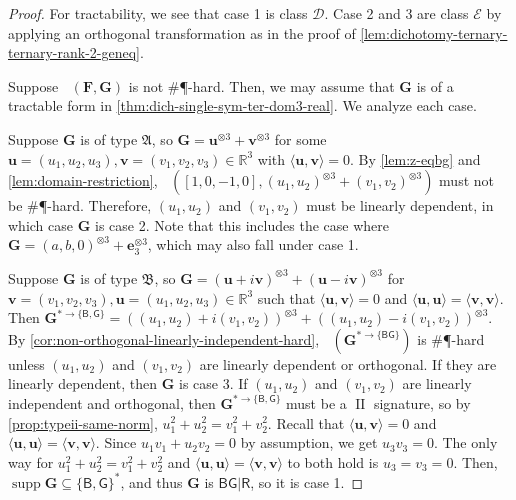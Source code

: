 \documentclass[11pt]{article}
\DeclareMathOperator{\holbs}{Holant^*_2}
\DeclareMathOperator{\holts}{Holant^*_3}
\DeclareMathOperator{\supp}{supp}
\DeclareMathOperator{\typeii}{II}
\newcommand{\db}{\mathsf{B}}
\newcommand{\dg}{\mathsf{G}}
\newcommand{\dr}{\mathsf{R}}
\newcommand{\sph}{\#\P-hard\xspace}
\newcommand{\teh}{^{\otimes 3}}
\newcommand{\domres}[1]{
  ^{*\to\{#1\}}
}
\newcommand{\tractBGR}{$\mathscr{D}$\xspace}
\newcommand{\tractBGGRBR}{$\mathscr{E}$\xspace}
\newcommand{\ternarytractgeneq}{$\mathfrak{A}$\xspace}
\newcommand{\ternarytractz}{$\mathfrak{B}$\xspace}
\begin{document}
\begin{proof}
  For tractability, we see that case 1 is class \tractBGR.
  Case 2 and 3 are class \tractBGGRBR by applying an orthogonal transformation as in the proof of \cref{lem:dichotomy-ternary-ternary-rank-2-geneq}.

  Suppose $\holts(\mathbf{F}, \mathbf{G})$ is not \sph. 
  Then, we may assume that $\mathbf{G}$ is of a tractable form in \cref{thm:dich-single-sym-ter-dom3-real}. 
  We analyze each case. 

  Suppose $\mathbf{G}$ is of type \ternarytractgeneq, so $\mathbf{G} = \mathbf{u}\teh + \mathbf{v}\teh$ for some $\mathbf{u} = (u_1, u_2, u_3), \mathbf{v} = (v_1, v_2, v_3) \in \mathbb{R}^3$ with $\langle \mathbf{u}, \mathbf{v} \rangle = 0$.
  By \cref{lem:z-eqbg} and \cref{lem:domain-restriction}, $\holbs([1, 0, -1, 0], (u_1, u_2)\teh + (v_1, v_2)\teh)$ must not be \sph.
  Therefore, $(u_1, u_2)$ and $(v_1, v_2)$ must be linearly dependent, in which case $\mathbf{G}$ is case 2.
  Note that this includes the case where $\mathbf{G} = (a, b, 0)\teh + \mathbf{e}_3 \teh$, which may also fall under case 1.

  Suppose $\mathbf{G}$ is of type \ternarytractz, so
  $\mathbf{G} = (\mathbf{u} + i \mathbf{v})\teh + (\mathbf{u} - i \mathbf{v})\teh$ for $\mathbf{v} = (v_1, v_2, v_3), \mathbf{u} = (u_1, u_2, u_3) \in \mathbb{R}^3$ such that
  $\langle \mathbf{u}, \mathbf{v} \rangle = 0$ and $\langle \mathbf{u}, \mathbf{u} \rangle = \langle \mathbf{v}, \mathbf{v} \rangle$.
  Then $\mathbf{G}\domres{\db, \dg} = ((u_1, u_2) + i (v_1, v_2))\teh + ((u_1, u_2) - i (v_1, v_2))\teh$.
  By \cref{cor:non-orthogonal-linearly-independent-hard}, $\holbs(\mathbf{G}\domres{\db \dg})$ is \sph unless $(u_1, u_2)$ and $(v_1, v_2)$ are linearly dependent or orthogonal.
  If they are linearly dependent, then $\mathbf{G}$ is case 3.
  If $(u_1, u_2)$ and $(v_1, v_2)$ are linearly independent and orthogonal, then $\mathbf{G}\domres{\db, \dg}$ must be a $\typeii$ signature, so by \cref{prop:typeii-same-norm}, $u_1^2 + u_2^2 = v_1^2 + v_2^2$.
  Recall that $\langle \mathbf{u}, \mathbf{v} \rangle = 0$ and $\langle \mathbf{u}, \mathbf{u} \rangle = \langle \mathbf{v}, \mathbf{v} \rangle$.
Since $u_1 v_1 + u_2 v_2 = 0$ by assumption, we get $u_3 v_3 = 0$.
  The only way for  $u_1^2 + u_2^2 = v_1^2 + v_2^2$
  and $\langle \mathbf{u}, \mathbf{u} \rangle = \langle \mathbf{v}, \mathbf{v} \rangle$ to both hold is  $u_3 = v_3 = 0$.
  Then, $\supp \mathbf{G} \subseteq \{\db, \dg\}^*$, and thus $\mathbf{G}$ is $\db \dg | \dr$, so it is case 1.
\end{proof}
\end{document}
